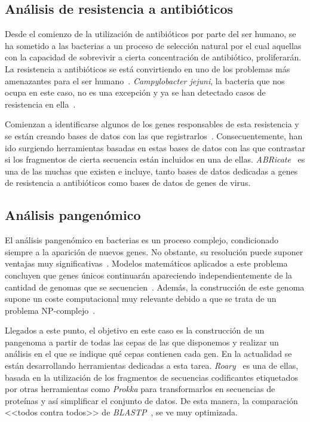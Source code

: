 \subsection{Análisis de resistencia a antibióticos}
Desde el comienzo de la utilización de antibióticos por parte del ser humano, se ha sometido a las bacterias a un proceso de selección natural por el cual aquellas con la capacidad de sobrevivir a cierta concentración de antibiótico, proliferarán. La resistencia a antibióticos se está convirtiendo en uno de los problemas más amenazantes para el ser humano~\cite{Neu1064}. \textit{Campylobacter jejuni}, la bacteria que nos ocupa en este caso, no es una excepción y ya se han detectado casos de resistencia en ella~\cite{Smith1999}. 

Comienzan a identificarse algunos de los genes responsables de esta resistencia y se están creando bases de datos con las que registrarlos~\cite{ARDB}. Consecuentemente, han ido surgiendo herramientas basadas en estas bases de datos con las que contrastar si los fragmentos de cierta secuencia están incluidos en una de ellas. \textit{ABRicate}~\cite{seemann_:mag_right:_2019} es una de las muchas que existen e incluye, tanto bases de datos dedicadas a genes de resistencia a antibióticos como bases de datos de genes de virus.

\subsection{Análisis pangenómico}
El análisis pangenómico en bacterias es un proceso complejo, condicionado siempre a la aparición de nuevos genes. No obstante, su resolución puede suponer ventajas muy significativas~\cite{MEDINI2005589}. Modelos matemáticos aplicados a este problema concluyen que genes únicos continuarán apareciendo independientemente de la cantidad de genomas que se secuencien~\cite{Tettelin13950}. Además, la construcción de este genoma supone un coste computacional muy relevante debido a que se trata de un problema NP-complejo~\cite{Nguyen2015}.

Llegados a este punto, el objetivo en este caso es la construcción de un pangenoma a partir de todas las cepas de las que disponemos y realizar un análisis en el que se indique qué cepas contienen cada gen. En la actualidad se están desarrollando herramientas dedicadas a esta tarea. \textit{Roary}~\cite{Page2015} es una de ellas, basada en la utilización de los fragmentos de secuencias codificantes etiquetados por otras herramientas como \textit{Prokka} para transformarlos en secuencias de proteínas y así simplificar el conjunto de datos. De esta manera, la comparación <<todos contra todos>> de \textit{BLASTP}~\cite{Madden}, se ve muy optimizada.

